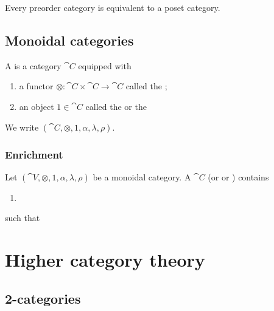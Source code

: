 \begin{lemma}
Every preorder category is equivalent to a poset category.
\end{lemma}

\section{Monoidal categories}
\begin{definition}
A  is a category $\cat{C}$ equipped with
\begin{enumerate}
\item a functor $\otimes: \cat{C}\times\cat{C} \to \cat{C}$ called the ;
\item an object $1\in \cat{C}$ called the  or the 
\end{enumerate}
We write $(\cat{C}, \otimes, 1, \alpha, \lambda, \rho)$.
\end{definition}

\subsection{Enrichment}
\begin{definition}
Let $(\cat{V}, \otimes, 1, \alpha, \lambda, \rho)$ be a monoidal category. A  $\cat{C}$ (or  or ) contains
\begin{enumerate}
\item 
\end{enumerate}
such that
\end{definition}


\chapter{Higher category theory}
\section{2-categories}
